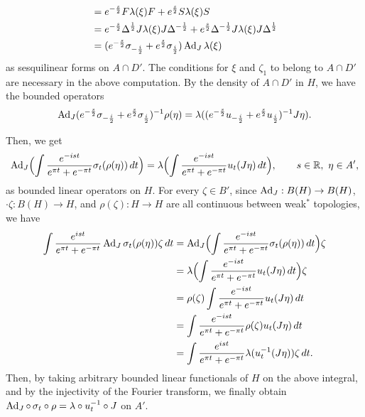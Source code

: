 \documentclass{../../small}
\begin{document}
\begin{pf}
\begin{align*}
&=e^{-\frac s2}F\lambda(\xi)F+e^{\frac s2}S\lambda(\xi)S\\
&=e^{-\frac s2}\Delta^{\frac12}J\lambda(\xi)J\Delta^{-\frac12}+e^{\frac s2}\Delta^{-\frac12}J\lambda(\xi)J\Delta^{\frac12}\\
&=(e^{-\frac s2}\sigma_{-\frac i2}+e^{\frac s2}\sigma_{\frac i2})\operatorname{Ad}_J\lambda(\xi)
\end{align*}
as sesquilinear forms on $A\cap D'$.
The conditions for $\xi$ and $\zeta_1$ to belong to $A\cap D'$ are necessary in the above computation.
By the density of $A\cap D'$ in $H$, we have the bounded operators
\[\operatorname{Ad}_J(e^{-\frac s2}\sigma_{-\frac i2}+e^{\frac s2}\sigma_{\frac i2})^{-1}\rho(\eta)=\lambda((e^{-\frac s2}u_{-\frac i2}+e^{\frac s2}u_{\frac i2})^{-1}J\eta).\]


Then, we get
\[\operatorname{Ad}_J\Bigl(\int\frac{e^{-ist}}{e^{\pi t}+e^{-\pi t}}\sigma_t(\rho(\eta))\,dt\Bigr)
=\lambda\Bigl(\int\frac{e^{-ist}}{e^{\pi t}+e^{-\pi t}}u_t(J\eta)\,dt\Bigr),\qquad s\in\mathbb{R},\ \eta\in A',\]
as bounded linear operators on $H$.
For every $\zeta\in B'$, since $\operatorname{Ad}_J:B(H)\to B(H)$, $\cdot\zeta:B(H)\to H$, and $\rho(\zeta):H\to H$ are all continuous between weak$^*$ topologies, we have
\begin{align*}
\int\frac{e^{ist}}{e^{\pi t}+e^{-\pi t}}\operatorname{Ad}_J\sigma_t(\rho(\eta))\zeta\,dt
&=\operatorname{Ad}_J\Bigl(\int\frac{e^{-ist}}{e^{\pi t}+e^{-\pi t}}\sigma_t(\rho(\eta))\,dt\Bigr)\zeta\\
&=\lambda\Bigl(\int\frac{e^{-ist}}{e^{\pi t}+e^{-\pi t}}u_t(J\eta)\,dt\Bigr)\zeta\\
&=\rho(\zeta)\int\frac{e^{-ist}}{e^{\pi t}+e^{-\pi t}}u_t(J\eta)\,dt\\
&=\int\frac{e^{-ist}}{e^{\pi t}+e^{-\pi t}}\rho(\zeta)u_t(J\eta)\,dt\\
&=\int\frac{e^{ist}}{e^{\pi t}+e^{-\pi t}}\lambda(u_t^{-1}(J\eta))\zeta\,dt.
\end{align*}
Then, by taking arbitrary bounded linear functionals of $H$ on the above integral, and by the injectivity of the Fourier transform, we finally obtain $\operatorname{Ad}_J\circ\,\sigma_t\circ\rho=\lambda\circ u_t^{-1}\circ J$ on $A'$.
\end{pf}
\end{document}
